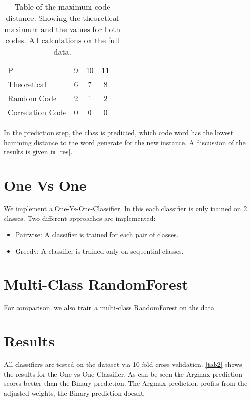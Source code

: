 \documentclass{article}
\begin{document}
\begin{table}[h]
	\centering
	\begin{tabular}{l c c c c}
        P	            &	9	& 10    &   11   \\
        Theoretical	    &	6	&  7    &    8   \\
        Random Code     &   2   &  1    &    2   \\
        Correlation Code&   0   &  0    &    0   \\ 
	\end{tabular}
	\caption{Table of the maximum code distance. Showing the theoretical maximum and the values for both codes. All calculations on the full data.}
	\label{tab1}
\end{table}

In the prediction step, the class is predicted, which code word has the lowest hamming distance to the word generate for the new instance.
A discussion of the results is given in \autoref{res}.

\section{One Vs One}

We implement a One-Vs-One-Classifier. In this each classifier is only trained on 2 classes.
Two different approaches are implemented:
\begin{itemize}
    \item Pairwise: A classifier is trained for each pair of classes.
    \item Greedy: A classifier is trained only on sequential classes. 
\end{itemize}

\section{Multi-Class RandomForest}

For comparison, we also train a multi-class RandomForest on the data. 

\section{Results} \label{res} 

All classifiers are tested on the dataset via 10-fold cross validation.
\autoref{tab2} shows the results for the One-vs-One Classifier.
As can be seen the Argmax prediction scores better than the Binary prediction.
The Argmax prediction profits from the adjusted weights, the Binary prediction doesnt.
\end{document}
